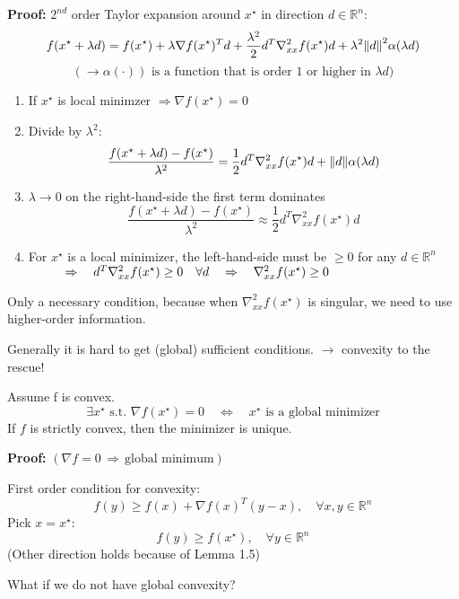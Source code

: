 \documentclass[12pt,a4paper,oneside]{scrartcl}
\newenvironment{lemmabox}[1][]{
	\refstepcounter{lemma}
	\begin{tcolorbox}[colback=teal!5!white,
		colframe=teal!60!black,
		fonttitle=\bfseries,
		boxrule=0.8pt,
		arc=3pt,
		left=8pt,right=8pt,top=6pt,bottom=6pt,
		title={Lemma \thelemma\if\relax\detokenize{#1}\relax\else\ (#1)\fi}]
		}{
	\end{tcolorbox}
}
\begin{document}
	\textbf{Proof:} $2^{nd}$ order Taylor expansion around $x^\star$ in direction $d \in \mathbb{R}^n$:
	\[
		f(x^\star + \lambda d) = f(x^\star) + \lambda\nabla f(x^\star)^Td + \frac{\lambda^2}{2}d^T \nabla_{xx}^2 f(x^\star) d + \lambda^2\norm{d}^2\alpha (\lambda d)
	\]
	\[
		(\to\alpha(\cdot)) \text{ is a function that is order $1$ or higher in $\lambda d$})
	\]
	\begin{enumerate}
		\item If $x^\star$ is local minimzer $\Rightarrow\nabla f(x^\star) = 0$
		\item Divide by $\lambda^2$:
		\[
			\frac{f(x^\star+\lambda d)-f(x^\star)}{\lambda^2} = \frac{1}{2} d^T \nabla_{xx}^2 f(x^\star) d + \norm{d}\alpha (\lambda d)
		\]
		\item $\lambda \to 0$ on the right-hand-side the first term dominates
		\[
			\frac{f(x^\star+\lambda d)-f(x^\star)}{\lambda^2} \approx \frac{1}{2} d^T \nabla_{xx}^2 f(x^\star) d
		\]
		\item For $x^\star$ is a local minimizer, the left-hand-side must be $\geq 0$ for any $d\in\mathbb{R}^n$\\$\hspace*{1cm}\Rightarrow\quad d^T \nabla_{xx}^2 f(x^\star) \geq 0 \quad\forall d\quad \Rightarrow\quad \nabla_{xx}^2 f(x^\star)\geq0$\hfill\qedsymbol{}
	\end{enumerate}
	
	Only a necessary condition, because when $\nabla_{xx}^2 f(x^\star)$ is singular, we need to use higher-order information.
	
	Generally it is hard to get (global) sufficient conditions. $\to$ convexity to the rescue!
	
	\begin{lemmabox}[First order N\&S condition for global minimizers]
		Assume f is convex.
		\[
			\exists x^\star \text{ s.t. } \nabla f(x^\star) = 0 \quad\Leftrightarrow\quad x^\star \text{ is a global minimizer}
		\]
		If $f$ is  strictly convex, then the minimizer is unique.
	\end{lemmabox} 	
	
	\textbf{Proof:} $(\nabla f = 0\,\Rightarrow\,\text{global minimum})$
	
	First order condition for convexity:
	\[
		f(y) \geq f(x) + \nabla f(x)^T(y-x),\quad\forall x,y\in\mathbb{R}^n
	\]
	Pick $x = x^\star$:
	\[
		f(y) \geq f(x^\star),\quad\forall y\in\mathbb{R}^n
	\]
	(Other direction holds because of Lemma 1.5)
	
	What if we do not have global convexity?
	
\end{document}
